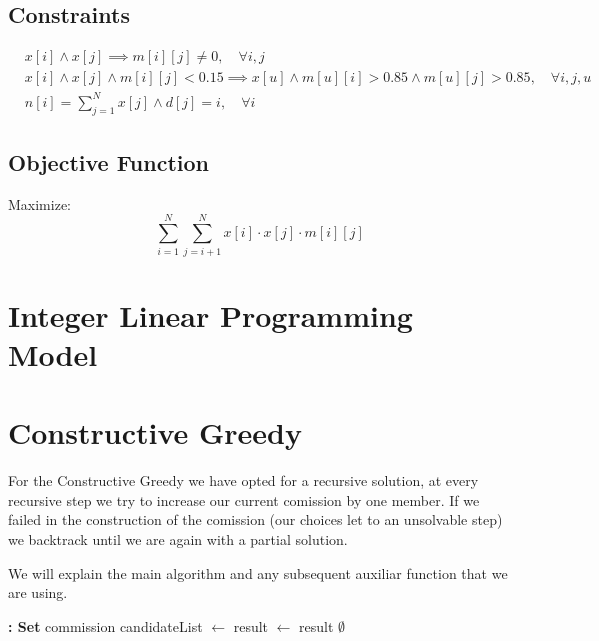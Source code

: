 \documentclass{article}
\begin{document}
\subsection*{Constraints}
\begin{align}
    & x[i] \land x[j] \implies m[i][j] \neq 0, \quad \forall i, j \label{eq:compatibility} \\
    & x[i] \land x[j] \land m[i][j] < 0.15 \implies x[u] \land m[u][i] > 0.85 \land m[u][j] > 0.85, \quad \forall i, j, u \label{eq:strong_compatibility} \\
    & n[i] = \sum_{j=1}^{N} x[j] \land d[j] = i, \quad \forall i \label{eq:department_count}
\end{align}

\subsection*{Objective Function}
Maximize:
\begin{equation}
    \sum_{i=1}^{N} \sum_{j=i+1}^{N} x[i] \cdot x[j] \cdot m[i][j]
\end{equation}

\newpage
\section{Integer Linear Programming Model}

\newpage
\section{Constructive Greedy}

For the Constructive Greedy we have opted for a recursive solution, at every recursive step we try to increase our current comission by one member. If we failed in the construction of the comission (our choices let to an unsolvable step) we backtrack until we are again with a partial solution.

We will explain the main algorithm and any subsequent auxiliar function that we are using.

\begin{algorithm}[H]
\begin{algorithmic}[1]
 \textbf{: Set}
        \State \Return commission
    \EndIf
    \State candidateList $\gets$ 
        \State result $\gets$ 
            \State \Return result
        \EndIf
    \EndFor
    \State \Return $\emptyset$
\EndFunction
\end{algorithmic}
\end{algorithm}
\end{document}
